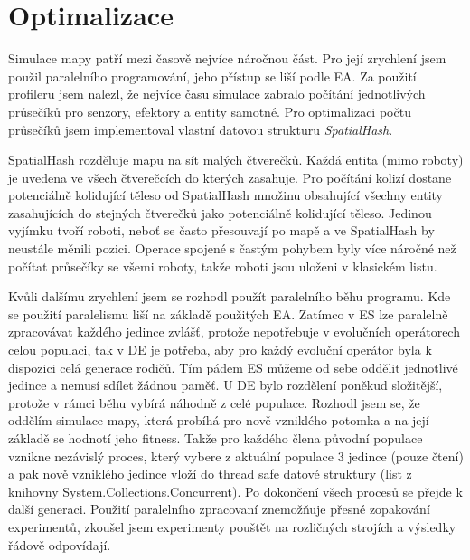 \section*{Optimalizace}
Simulace mapy patří mezi časově nejvíce náročnou část. Pro její zrychlení jsem použil paralelního programování, jeho přístup se liší podle EA. Za použití profileru jsem nalezl, že nejvíce času simulace zabralo počítání jednotlivých průsečíků pro senzory, efektory a entity samotné. Pro optimalizaci počtu průsečíků jsem implementoval vlastní datovou strukturu \textit{SpatialHash}. 
\par 
SpatialHash rozděluje mapu na sít malých čtverečků. Každá entita (mimo roboty) je uvedena ve všech čtverečcích do kterých zasahuje. Pro počítání kolizí dostane potenciálně kolidující těleso od SpatialHash množinu obsahující všechny entity zasahujících do stejných čtverečků jako potenciálně kolidující těleso. Jedinou vyjímku tvoří roboti, neboť se často přesouvají po mapě a ve SpatialHash by neustále měnili pozici. Operace spojené s častým pohybem byly více náročné než počítat průsečíky se všemi roboty, takže roboti jsou uloženi v klasickém listu.
\par
Kvůli dalšímu zrychlení jsem se rozhodl použít paralelního běhu programu. Kde se použití paralelismu liší na základě použitých EA. Zatímco v ES lze paralelně zpracovávat každého jedince zvlášť, protože nepotřebuje v evolučních operátorech celou populaci, tak v DE je potřeba, aby pro každý evoluční operátor byla k dispozici celá generace rodičů. Tím pádem ES můžeme od sebe oddělit jednotlivé jedince a nemusí sdílet žádnou paměť. U DE bylo rozdělení poněkud složitější, protože v rámci běhu vybírá náhodně z celé populace. Rozhodl jsem se, že oddělím simulace mapy, která probíhá pro nově vzniklého potomka a na její základě se hodnotí jeho fitness. Takže pro každého člena původní populace vznikne nezávislý proces, který vybere z aktuální populace 3 jedince (pouze čtení) a pak nově vzniklého jedince vloží do thread safe datové struktury (list z knihovny System.Collections.Concurrent). Po dokončení všech procesů se přejde k další generaci. Použití paralelního zpracovaní znemožňuje přesné zopakování experimentů, zkoušel jsem experimenty pouštět na rozličných strojích a výsledky řádově odpovídají.  
\clearpage
